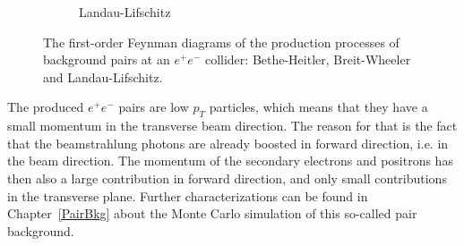 \begin{figure}[h]
\begin{subfigure}[b]{0.33\textwidth}
\caption{Landau-Lifschitz}
\end{subfigure}
\caption[Feynman diagrams of the production of the background pairs.]{The first-order Feynman diagrams of the production processes of background pairs at an $e^+e^-$ collider: Bethe-Heitler, Breit-Wheeler and Landau-Lifschitz.}
\label{fig:Feynman:pair_production}
\end{figure}

The produced $e^+e^-$ pairs are low $p_T$ particles, which means that they have a small momentum in the transverse beam direction.
The reason for that is the fact that the beamstrahlung photons are already boosted in forward direction, i.e. in the beam direction.
The momentum of the secondary electrons and positrons has then also a large contribution in forward direction, and only small contributions in the transverse plane.
Further characterizations can be found in Chapter~\ref{PairBkg} about the Monte Carlo simulation of this so-called pair background.

